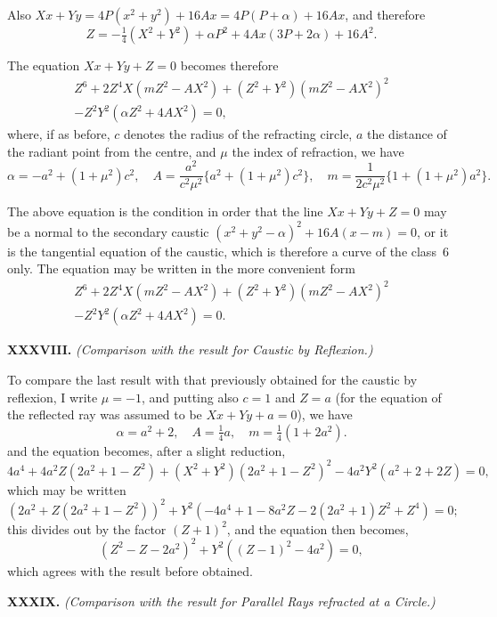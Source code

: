 \documentclass[11pt,a4paper]{book}
\begin{document}
\begin{center}
Also $Xx + Yy = 4P(x^{2} + y^{2}) + 16Ax = 4P(P + \alpha) + 16Ax$,
and therefore
\[
Z = -\tfrac{1}{4}(X^{2} + Y^{2}) + \alpha P^{2} + 4Ax(3P + 2\alpha) + 16A^{2}.
\]

The equation $Xx + Yy + Z = 0$ becomes therefore
\begin{multline*}
Z^{6} + 2Z^{4}X(mZ^{2} - AX^{2}) + (Z^{2} + Y^{2})(mZ^{2} - AX^{2})^{2} \\
- Z^{2}Y^{2}(\alpha Z^{2} + 4AX^{2}) = 0,
\end{multline*}
where, if as before, $c$ denotes the radius of the refracting circle,
$a$ the distance of the radiant point from the centre, and $\mu$
the index of refraction, we have
\[
\alpha = -a^{2} + (1 + \mu^{2})c^{2}, \quad
A = \frac{a^{2}}{c^{2}\mu^{2}} \{ a^{2} + (1 + \mu^{2})c^{2} \}, \quad
m = \frac{1}{2c^{2}\mu^{2}} \{ 1 + (1 + \mu^{2})a^{2} \}.
\]

The above equation is the condition in order that the line
$Xx + Yy + Z = 0$ may be a normal to the secondary caustic
$(x^{2} + y^{2} - \alpha)^{2} + 16A(x - m) = 0$, or it is the tangential
equation of the caustic, which is therefore a curve of the class~6 only.
The equation may be written in the more convenient form
\begin{multline*}
Z^{6} + 2Z^{4}X(mZ^{2} - AX^{2}) + (Z^{2} + Y^{2})(mZ^{2} - AX^{2})^{2} \\
- Z^{2}Y^{2}(\alpha Z^{2} + 4AX^{2}) = 0.
\end{multline*}

\medskip\noindent\textbf{XXXVIII.}
\textit{(Comparison with the result for Caustic by Reflexion.)}

To compare the last result with that previously obtained for
the caustic by reflexion, I write $\mu = -1$, and putting also
$c = 1$ and $Z = a$ (for the equation of the reflected ray was
assumed to be $Xx + Yy + a = 0$), we have
\[
\alpha = a^{2} + 2, \quad A = \tfrac{1}{4}a, \quad m = \tfrac{1}{4}(1 + 2a^{2}).
\]
and the equation becomes, after a slight reduction,
\[
4a^{4} + 4a^{2}Z(2a^{2} + 1 - Z^{2}) + (X^{2} + Y^{2})(2a^{2} + 1 - Z^{2})^{2}
- 4a^{2}Y^{2}(a^{2} + 2 + 2Z) = 0,
\]
which may be written
\[
(2a^{2} + Z(2a^{2} + 1 - Z^{2}))^{2} + Y^{2}(-4a^{4} + 1 - 8a^{2}Z
- 2(2a^{2} + 1)Z^{2} + Z^{4}) = 0;
\]
this divides out by the factor $(Z + 1)^{2}$, and the equation then becomes,
\[
(Z^{2} - Z - 2a^{2})^{2} + Y^{2}((Z - 1)^{2} - 4a^{2}) = 0,
\]
which agrees with the result before obtained.

\medskip\noindent\textbf{XXXIX.}
\textit{(Comparison with the result for Parallel Rays refracted at a Circle.)}


\end{center}
\end{document}
